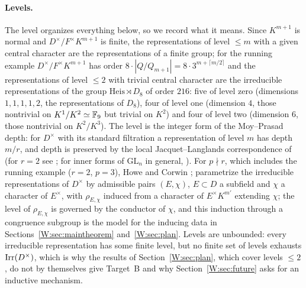 \paragraph{Levels.}  The level organizes everything below, so we
record what it means.  Since $K^{m+1}$ is normal and
$D^\times/F^\times K^{m+1}$ is finite, the representations of level
$\le m$ with a given central character are the representations of a
finite group; for the running example $D^\times/F^\times K^{m+1}$ has
order $8\cdot|Q/Q_{m+1}|=8\cdot3^{m+\lceil m/2\rceil}$ and the
representations of level $\le2$ with trivial central character are the
irreducible representations of the group $\mathrm{Heis}\rtimes D_8$ of
order $216$: five of level zero (dimensions $1,1,1,1,2$, the
representations of $D_8$), four of level one (dimension $4$, those
nontrivial on $K^1/K^2\simeq\mathbb F_9$ but trivial on $K^2$) and four of
level two (dimension $6$, those nontrivial on $K^2/K^3$).  The level is
the integer form of the Moy--Prasad depth: for $D^\times$ with its
standard filtration a representation of level $m$ has depth $m/r$, and
depth is preserved by the local Jacquet--Langlands correspondence
of \cite{DKV84} (for $r=2$ see \cite[Ch.~13]{BH06}; for inner forms of
$\mathrm{GL}_n$ in general, \cite{ABPS16}).  For $p\nmid r$, which includes the running
example ($r=2$, $p=3$), Howe and Corwin \cite{How77b}; \cite{Cor74} parametrize the
irreducible representations of $D^\times$ by admissible pairs $(E,\chi)$,
$E\subset D$ a subfield and $\chi$ a character of $E^\times$, with
$\rho_{E,\chi}$ induced from a character of $E^\times K^{m'}$ extending
$\chi$; the level of $\rho_{E,\chi}$ is governed by the conductor of
$\chi$, and this induction through a congruence subgroup is the model
for the inducing data in Sections~\ref{W:sec:maintheorem}
and~\ref{W:sec:plan}.  Levels are unbounded: every irreducible
representation has some finite level, but no finite set of levels
exhausts $\operatorname{Irr}(D^\times)$, which is why the results of
Section~\ref{W:sec:plan}, which cover levels $\le2$, do not by themselves
give Target~B and why Section~\ref{W:sec:future} asks for an inductive
mechanism.

